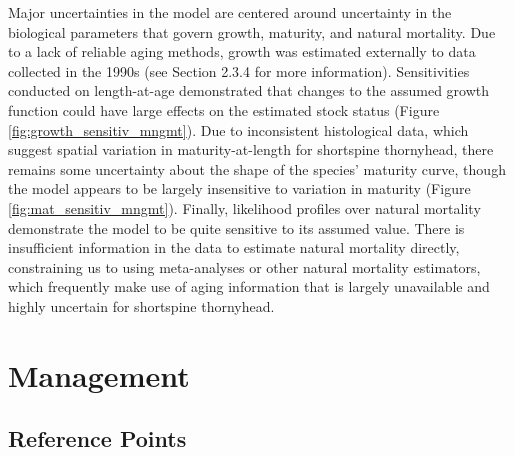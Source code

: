 \documentclass[11pt,
  letterpaper,
]{article}
\begin{document}
Major uncertainties in the model are centered around uncertainty in the biological parameters that govern growth, maturity, and natural mortality. Due to a lack of reliable aging methods, growth was estimated externally to data collected in the 1990s (see Section 2.3.4 for more information). Sensitivities conducted on length-at-age demonstrated that changes to the assumed growth function could have large effects on the estimated stock status (Figure \ref{fig:growth_sensitiv_mngmt}). Due to inconsistent histological data, which suggest spatial variation in maturity-at-length for shortspine thornyhead, there remains some uncertainty about the shape of the species' maturity curve, though the model appears to be largely insensitive to variation in maturity (Figure \ref{fig:mat_sensitiv_mngmt}). Finally, likelihood profiles over natural mortality demonstrate the model to be quite sensitive to its assumed value. There is insufficient information in the data to estimate natural mortality directly, constraining us to using meta-analyses or other natural mortality estimators, which frequently make use of aging information that is largely unavailable and highly uncertain for shortspine thornyhead.

\hypertarget{management}{%
\section{Management}\label{management}}

\hypertarget{reference-points-1}{%
\subsection{Reference Points}\label{reference-points-1}}
\end{document}
